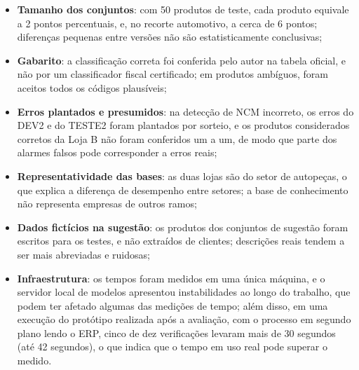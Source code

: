 \begin{itemize}
    \item \textbf{Tamanho dos conjuntos}: com 50 produtos de teste, cada produto equivale a 2 pontos percentuais, e, no recorte automotivo, a cerca de 6 pontos; diferenças pequenas entre versões não são estatisticamente conclusivas;
    \item \textbf{Gabarito}: a classificação correta foi conferida pelo autor na tabela oficial, e não por um classificador fiscal certificado; em produtos ambíguos, foram aceitos todos os códigos plausíveis;
    \item \textbf{Erros plantados e presumidos}: na detecção de NCM incorreto, os erros do DEV2 e do TESTE2 foram plantados por sorteio, e os produtos considerados corretos da Loja B não foram conferidos um a um, de modo que parte dos alarmes falsos pode corresponder a erros reais;
    \item \textbf{Representatividade das bases}: as duas lojas são do setor de autopeças, o que explica a diferença de desempenho entre setores; a base de conhecimento não representa empresas de outros ramos;
    \item \textbf{Dados fictícios na sugestão}: os produtos dos conjuntos de sugestão foram escritos para os testes, e não extraídos de clientes; descrições reais tendem a ser mais abreviadas e ruidosas;
    \item \textbf{Infraestrutura}: os tempos foram medidos em uma única máquina, e o servidor local de modelos apresentou instabilidades ao longo do trabalho, que podem ter afetado algumas das medições de tempo; além disso, em uma execução do protótipo realizada após a avaliação, com o processo em segundo plano lendo o ERP, cinco de dez verificações levaram mais de 30 segundos (até 42 segundos), o que indica que o tempo em uso real pode superar o medido.
\end{itemize}

